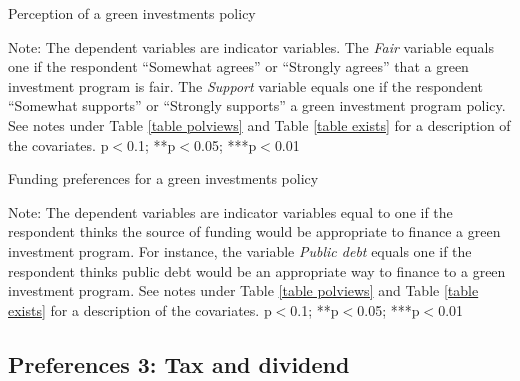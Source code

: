 \documentclass{article}
\begin{document}
\begin{table}[h!]
	\caption{Perception of a green investments policy}
	\begin{center}
		\scalebox{0.7}{}
	\end{center}
	{\footnotesize Note: The dependent variables are indicator variables. The \textit{Fair} variable equals one if the respondent ``Somewhat agrees'' or ``Strongly agrees'' that a green investment program is fair. The \textit{Support} variable equals one if the respondent ``Somewhat supports'' or ``Strongly supports'' a green investment program policy. See notes under Table \ref{table polviews} and Table \ref{table exists} for a description of the covariates.
	\newline *p$<$0.1; **p$<$0.05; ***p$<$0.01}
\end{table}	

\begin{table}[h!]
	\caption{Funding preferences for a green investments policy}
	\begin{center}
		\scalebox{0.7}{}
	\end{center}
	{\footnotesize Note: The dependent variables are indicator variables equal to one if the respondent thinks the source of funding would be appropriate to finance a green investment program. For instance, the variable \textit{Public debt} equals one if the respondent thinks public debt would be an appropriate way to finance to a green investment program. See notes under Table \ref{table polviews} and Table \ref{table exists} for a description of the covariates.
	\newline *p$<$0.1; **p$<$0.05; ***p$<$0.01}
\end{table}	



\clearpage
\subsection{Preferences 3: Tax and dividend}
\end{document}
